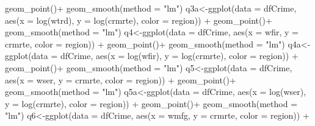 \documentclass[]{article}
\newenvironment{Shaded}{}{}
\newcommand{\DataTypeTok}[1]{#1}
\newcommand{\KeywordTok}[1]{\textcolor[rgb]{0.00,0.00,1.00}{#1}}
\newcommand{\NormalTok}[1]{#1}
\newcommand{\OperatorTok}[1]{#1}
\newcommand{\StringTok}[1]{\textcolor[rgb]{0.00,0.50,0.50}{#1}}
\begin{document}
\begin{Shaded}
\begin{Highlighting}[]
\StringTok{      }\KeywordTok{geom_point}\NormalTok{()}\OperatorTok{+}
\StringTok{  }\KeywordTok{geom_smooth}\NormalTok{(}\DataTypeTok{method =} \StringTok{"lm"}\NormalTok{)}
\NormalTok{q3a<-}\KeywordTok{ggplot}\NormalTok{(}\DataTypeTok{data =}\NormalTok{ dfCrime, }\KeywordTok{aes}\NormalTok{(}\DataTypeTok{x =} \KeywordTok{log}\NormalTok{(wtrd), }\DataTypeTok{y =} \KeywordTok{log}\NormalTok{(crmrte), }\DataTypeTok{color =}\NormalTok{ region)) }\OperatorTok{+}\StringTok{ }
\StringTok{      }\KeywordTok{geom_point}\NormalTok{()}\OperatorTok{+}
\StringTok{  }\KeywordTok{geom_smooth}\NormalTok{(}\DataTypeTok{method =} \StringTok{"lm"}\NormalTok{)}
\NormalTok{q4<-}\KeywordTok{ggplot}\NormalTok{(}\DataTypeTok{data =}\NormalTok{ dfCrime, }\KeywordTok{aes}\NormalTok{(}\DataTypeTok{x =}\NormalTok{ wfir, }\DataTypeTok{y =}\NormalTok{ crmrte, }\DataTypeTok{color =}\NormalTok{ region)) }\OperatorTok{+}\StringTok{ }
\StringTok{      }\KeywordTok{geom_point}\NormalTok{()}\OperatorTok{+}
\StringTok{  }\KeywordTok{geom_smooth}\NormalTok{(}\DataTypeTok{method =} \StringTok{"lm"}\NormalTok{)}
\NormalTok{q4a<-}\KeywordTok{ggplot}\NormalTok{(}\DataTypeTok{data =}\NormalTok{ dfCrime, }\KeywordTok{aes}\NormalTok{(}\DataTypeTok{x =} \KeywordTok{log}\NormalTok{(wfir), }\DataTypeTok{y =} \KeywordTok{log}\NormalTok{(crmrte), }\DataTypeTok{color =}\NormalTok{ region)) }\OperatorTok{+}\StringTok{ }
\StringTok{      }\KeywordTok{geom_point}\NormalTok{()}\OperatorTok{+}
\StringTok{  }\KeywordTok{geom_smooth}\NormalTok{(}\DataTypeTok{method =} \StringTok{"lm"}\NormalTok{)}
\NormalTok{q5<-}\KeywordTok{ggplot}\NormalTok{(}\DataTypeTok{data =}\NormalTok{ dfCrime, }\KeywordTok{aes}\NormalTok{(}\DataTypeTok{x =}\NormalTok{ wser, }\DataTypeTok{y =}\NormalTok{ crmrte, }\DataTypeTok{color =}\NormalTok{ region)) }\OperatorTok{+}\StringTok{ }
\StringTok{      }\KeywordTok{geom_point}\NormalTok{()}\OperatorTok{+}
\StringTok{  }\KeywordTok{geom_smooth}\NormalTok{(}\DataTypeTok{method =} \StringTok{"lm"}\NormalTok{)}
\NormalTok{q5a<-}\KeywordTok{ggplot}\NormalTok{(}\DataTypeTok{data =}\NormalTok{ dfCrime, }\KeywordTok{aes}\NormalTok{(}\DataTypeTok{x =} \KeywordTok{log}\NormalTok{(wser), }\DataTypeTok{y =} \KeywordTok{log}\NormalTok{(crmrte), }\DataTypeTok{color =}\NormalTok{ region)) }\OperatorTok{+}\StringTok{ }
\StringTok{      }\KeywordTok{geom_point}\NormalTok{()}\OperatorTok{+}
\StringTok{  }\KeywordTok{geom_smooth}\NormalTok{(}\DataTypeTok{method =} \StringTok{"lm"}\NormalTok{)}
\NormalTok{q6<-}\KeywordTok{ggplot}\NormalTok{(}\DataTypeTok{data =}\NormalTok{ dfCrime, }\KeywordTok{aes}\NormalTok{(}\DataTypeTok{x =}\NormalTok{ wmfg, }\DataTypeTok{y =}\NormalTok{ crmrte, }\DataTypeTok{color =}\NormalTok{ region)) }\OperatorTok{+}\StringTok{ }

\end{Highlighting}
\end{Shaded}
\end{document}
